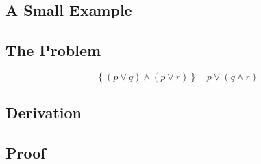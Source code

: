 \documentclass[../main.tex]{subfiles}
\begin{document}
\begin{subappendices}

\renewcommand{\thesection}{\Alph{section}}%

\section{A Small Example}
\label{appendix}

\subsection{The Problem}

\begin{equation*}
\{\ (p ∨ q) ∧ (p ∨ r)\ \} \vdash p ∨ (q ∧ r)
\end{equation*}

\subsection{\TSTP Derivation}


\subsection{\Agda Proof}

\end{subappendices}
\end{document}
